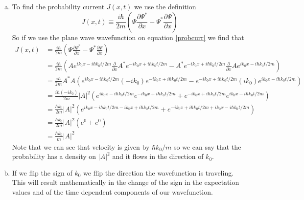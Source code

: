 \documentclass[11pt]{article}
\numberwithin{equation}{section}
\begin{document}
\begin{enumerate}[(a)]
\item
To find the probability current $J(x,t)$ we use the definition 
\begin{equation}
J(x,t)\equiv\frac{i\hbar}{2m}\left(\Psi\frac{\partial\Psi^*}{\partial x}-\Psi^*\frac{\partial\Psi}{\partial x}\right)
\label{probcurr}
\end{equation}
So if we use the plane wave wavefunction on equation \ref{probcurr} we find that
\begin{align*}
J(x,t) &= \frac{i\hbar}{2m}\left(\Psi\frac{\partial\Psi^*}{\partial x}-\Psi^*\frac{\partial\Psi}{\partial x}\right)\\ 
&= \frac{i\hbar}{2m}\left(Ae^{ik_0x-i\hbar k_0t/2m}\frac{\partial}{\partial x}A^*e^{-ik_0x+i\hbar k_0t/2m}-A^*e^{-ik_0x+i\hbar k_0t/2m}\frac{\partial}{\partial x}Ae^{ik_0x-i\hbar k_0t/2m}\right)\\ 
&= \frac{i\hbar}{2m}A^*A\left(e^{ik_0x-i\hbar k_0t/2m}(-ik_0)e^{-ik_0x+i\hbar k_0t/2m}-e^{-ik_0x+i\hbar k_0t/2m}(ik_0)e^{ik_0x-i\hbar k_0t/2m}\right)\\ 
&= \frac{i\hbar(-ik_0)}{2m}|A|^2\left(e^{ik_0x-i\hbar k_0t/2m}e^{-ik_0x+i\hbar k_0t/2m}+e^{-ik_0x+i\hbar k_0t/2m}e^{ik_0x-i\hbar k_0t/2m}\right)\\ 
&= \frac{\hbar k_0}{2m}|A|^2\left(e^{ik_0x-i\hbar k_0t/2m-ik_0x+i\hbar k_0t/2m}+e^{-ik_0x+i\hbar k_0t/2m+ik_0x-i\hbar k_0t/2m}\right)\\ 
&= \frac{\hbar k_0}{2m}|A|^2\left(e^{0}+e^{0}\right)\\ 
&= \frac{\hbar k_0}{m}|A|^2
\end{align*}
Note that we can see that velocity is given by $\hbar k_0/m$ so we can say that the probability has a density on $|A|^2$ and it flows in the direction of $k_0$.

\item
If we flip the sign of $k_0$ we flip the direction the wavefunction is traveling. This will result mathematically in the change of the sign in the expectation values and of the time dependent components of our wavefunction.
\end{enumerate}
\end{document}
